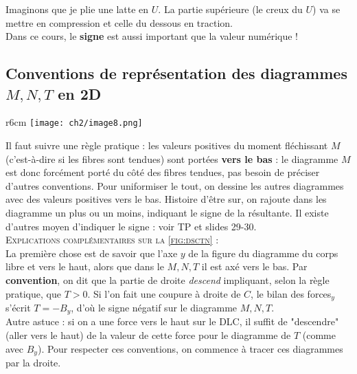 	Imaginons que  je plie une latte en $U$. La partie supérieure (le 
	creux du $U$) va se mettre en compression et celle du dessous en 
	traction.\\
	\danger Dans ce cours, le \textbf{signe} est aussi important que la 
	valeur numérique !
	
	\subsection{Conventions de représentation des diagrammes $M, N, T$ 
	en 2D}
	\begin{wrapfigure}[9]{r}{6cm}
	\vspace{-8mm}
	\texttt{[image: ch2/image8.png]}
	\label{fig:dsctn}
	\end{wrapfigure}	
	Il faut suivre une règle pratique : les valeurs positives du 
	moment fléchissant $M$ (c'est-à-dire si les fibres sont tendues) 
	sont portées \textbf{vers le bas} : le diagramme $M$ est donc 
	forcément porté du côté des fibres tendues, pas besoin de préciser 
	d'autres conventions. Pour uniformiser le tout, on dessine les autres 
	diagrammes avec des valeurs positives vers le bas. Histoire d'être 
	sur, on rajoute dans les diagramme un plus ou un moins, indiquant 
	le signe de la résultante. Il existe d'autres moyen d'indiquer 
	le signe : voir TP et slides 29-30. \\
	
	\textsc{Explications complémentaires sur la \autoref{fig:dsctn}} : \\
	La première chose est de savoir que l'axe $y$ de la figure du 
	diagramme du corps libre et vers le haut, alors que dans le 
	$M,N,T$ il est axé vers le bas. Par \textbf{convention}, on dit 
	que la partie de droite \textit{descend} impliquant, selon la 
	règle pratique, que $T>0$. Si l'on fait une coupure à droite de 
	$C$, le bilan des forces$_y$ s'écrit $T=-B_y$, d'où le signe 
	négatif sur le diagramme $M,N,T$.\\
	Autre astuce : si on a une force vers le haut sur le DLC, il 
	suffit de "descendre" (aller vers le haut) de la valeur de cette 
	force pour le diagramme de $T$ (comme avec $B_y$). Pour respecter 
	ces conventions, on commence à tracer ces diagrammes par la 
	droite.\\
	
